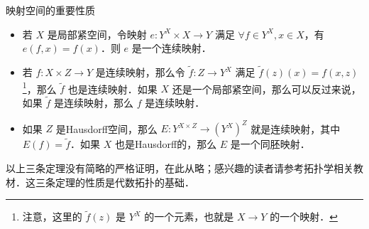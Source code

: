 \begin{theorem}{映射空间的重要性质}\label{Topo8_the1}
\begin{itemize}
\item 若 $X$ 是局部紧空间，令映射 $e:Y^X\times X\rightarrow Y$ 满足 $\forall f\in Y^X, x\in X$，有 $e(f, x)=f(x)$．则 $e$ 是一个连续映射．
\item 若 $f:X\times Z\rightarrow Y$ 是连续映射，那么令 $\tilde{f}:Z\rightarrow Y^X$ 满足 $\tilde{f}(z)(x)=f(x, z)$\footnote{注意，这里的 $\tilde{f}(z)$ 是 $Y^X$ 的一个元素，也就是 $X\rightarrow Y$ 的一个映射．}，那么 $\tilde{f}$ 也是连续映射．如果 $X$ 还是一个局部紧空间，那么可以反过来说，如果 $\tilde{f}$ 是连续映射，那么 $f$ 是连续映射．
\item 如果 $Z$ 是Hausdorff空间，那么 $E:Y^{X\times Z}\rightarrow(Y^X)^Z$ 就是连续映射，其中 $E(f)=\tilde{f}$．如果 $X$ 也是Hausdorff的，那么 $E$ 是一个同胚映射．

\end{itemize}
\end{theorem}

以上三条定理没有简略的严格证明，在此从略；感兴趣的读者请参考拓扑学相关教材．这三条定理的性质是代数拓扑的基础．